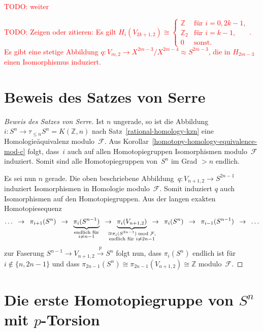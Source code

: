 \documentclass[11pt, a4paper, german]{article}
\theoremstyle{definition}
\theoremstyle{remark}
\newcommand{\TODO}[1]{\textcolor{red}{TODO: #1}} %
\newcommand{\R}{\mathbb{R}} %
\newcommand{\Z}{\mathbb{Z}} %
\newcommand{\F}{\mathcal{F}} %
\newcommand{\V}[2]{V_{{#2},{#1}}} %
\begin{document}
\TODO{weiter}


\TODO{Zeigen oder zitieren: Es gilt $H_i(\V{2}{2k+1}) \cong \begin{cases}
  \Z & \text{für } i = 0, 2k-1, \\
  \Z_2 & \text{für } i = k-1, \\
  0 & \text{sonst.}
\end{cases}$.
Es gibt eine stetige Abbildung $q : \V{2}{m} \to X^{2m-3} / X^{2m-4} \approx S^{2m-3}$, die in $H_{2m-3}$ einen Isomorphismus induziert.}

\section{Beweis des Satzes von Serre}

\begin{proof}[Beweis des Satzes von Serre]
  Ist $n$ ungerade, so ist die Abbildung $i : S^n \to \tau_{\leq n} S^n = K(\Z, n)$ nach Satz~\ref{rational-homology-kzn} eine Homologieäquivalenz modulo~$\F$.
  Aus Korollar~\ref{homotopy-homology-equivalence-mod-c} folgt, dass~$i$ auch auf allen Homotopiegruppen Isomorphismen modulo~$\F$ induziert.
  Somit sind alle Homotopiegruppen von~$S^n$ im Grad $> n$ endlich.

  Es sei nun $n$ gerade.
  Die oben beschriebene Abbildung~$q : \V{2}{n+1} \to S^{2n-1}$ induziert Isomorphismen in Homologie modulo~$\F$.
  Somit induziert $q$ auch Isomorphismen auf den Homotopiegruppen.
  Aus der langen exakten Homotopiesequenz
  \[
    \ldots
    \enspace\to\enspace
    \pi_{i+1}(S^n)
    \enspace\to\enspace
    \underbrace{\pi_i(S^{n-1})}_{\substack{\text{endlich für} \\ i \neq n-1}}
    \enspace\to\enspace \underbrace{\pi_i(\V{2}{n+1})}_{\mathclap{\substack{\cong \pi_i(S^{2n-1}) \bmod{\F}, \\ \text{endlich für } i \neq 2n-1}}}
    \enspace\to\enspace
    \pi_i(S^n)
    \enspace\to\enspace
    \pi_{i-1}(S^{n-1})
    \enspace\to\enspace
    \ldots
  \]
  zur Faserung $S^{n-1} \to \V{2}{n+1} \xrightarrow{p} S^n$ folgt nun, dass $\pi_i(S^n)$ endlich ist für $i \not\in \{ n, 2n-1 \}$ und dass $\pi_{2n-1}(S^n) \cong \pi_{2n-1}(\V{2}{n+1}) \cong \Z$ modulo~$\F$.
\end{proof}

\section{Die erste Homotopiegruppe von $S^n$ mit $p$-Torsion}
\end{document}
